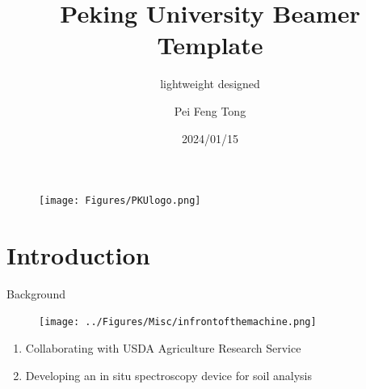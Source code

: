 \documentclass[10pt,hyperref={colorlinks,citecolor=blue,urlcolor=peking_blue,linkcolor=}]{beamer}
\author[Pei Feng Tong]{Pei Feng Tong}
\title{Peking University Beamer Template}
\subtitle{lightweight designed}
\institute{Guanghua School of Management, Peking University}
\date{
2024/01/15}
\theoremstyle{plain}
\newif\ifplacelogo %
\begin{document}
{
\begin{frame}
    \titlepage
    \begin{figure}[htpb]
        \begin{center}
            \texttt{[image: Figures/PKUlogo.png]}
        \end{center}
    \end{figure}
\end{frame}
}

\placelogofalse

\section{Introduction}
\begin{frame}{Background}
\begin{figure}[Visit to Auburn Lab in Alabama]
\begin{center}
\texttt{[image: ../Figures/Misc/infrontofthemachine.png]}
\end{center}
\end{figure}
\begin{enumerate}
\item Collaborating with USDA Agriculture Research Service
\item Developing an in situ spectroscopy device for soil analysis
\end{enumerate}
\end{frame}
\end{document}
